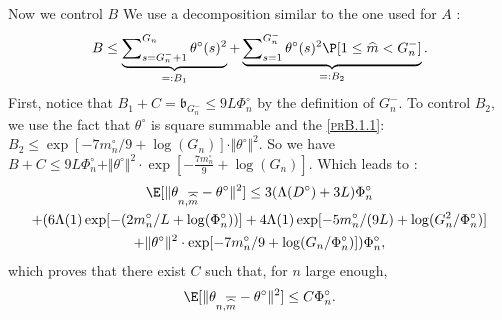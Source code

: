 Now we control $B$ We use a decomposition similar to the one used for $A$ :
\[ B \leq \underbrace{\sum\nolimits_{s = G_{n}^{-} + 1}^{G_{n}} \theta^{\circ}(s)^{2}}_{=: B_{1}} + \underbrace{\sum\nolimits_{s = 1}^{G_{n}^{-}} \theta^{\circ}(s)^{2} \P[1 \leq \widehat{m} < G_{n}^{-}]}_{=: B_{2}}.\]
First, notice that $B_{1} + C = \mathfrak{b}_{G_{n}^{-}} \leq 9 L \Phi_{n}^{\circ}$ by the definition of $G_{n}^{-}.$
To control $B_{2},$ we use the fact that $\theta^{\circ}$ is square summable and the \textsc{\cref{prB.1.1}}: $B_{2} \leq \exp[-7 m_{n}^{\circ}/9 + \log(G_{n})] \cdot \Vert \theta^{\circ} \Vert^{2}$.
So we have $B + C \leq 9 L \Phi_{n}^{\circ} + \Vert \theta^{\circ} \Vert^{2} \cdot \exp[-\frac{7 m_{n}^{\circ}}{9} + \log(G_{n})]$.
Which leads to :
\begin{multline*}
\E[\Vert \theta_{n, \overline{\widehat{m}}} - \theta^{\circ} \Vert^{2}] \leq 3 ( \Lambda(D^{\circ}) + 3 L ) \Phi_{n}^{\circ}\\
  + (6 \Lambda(1) \exp[- (2 m_{n}^{\circ}/L + \log(\Phi_{n}^{\circ}))] + 4 \Lambda(1) \exp[-5 m_{n}^{\circ}/(9 L) + \log (G_{n}^{2}/\Phi_{n}^{\circ})]\\
  + \Vert \theta^{\circ} \Vert^{2} \cdot \exp[-7 m_{n}^{\circ}/9 + \log(G_{n}/\Phi_{n}^{\circ})]) \Phi_{n}^{\circ},
\end{multline*}
which proves that there exist $C$ such that, for $n$ large enough,
\[\E[\Vert \theta_{n, \overline{\widehat{m}}} - \theta^{\circ} \Vert^{2}] \leq C \Phi_{n}^{\circ}.\]
\proEnd